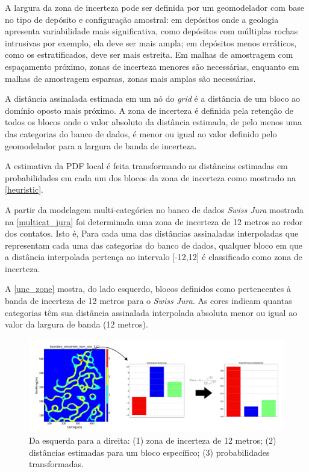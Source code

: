 A largura da zona de incerteza pode ser definida por um geomodelador com base no tipo de depósito e configuração amostral: em depósitos onde a geologia apresenta variabilidade mais significativa, como depósitos com múltiplas rochas intrusivas por exemplo, ela deve ser mais ampla; em depósitos menos erráticos, como os estratificados, deve ser mais estreita. Em malhas de amostragem com espaçamento próximo, zonas de incerteza menores são necessárias, enquanto em malhas de amostragem esparsas, zonas mais amplas são necessárias.

A distância assinalada estimada em um nó do \textit{grid} é a distância de um bloco ao domínio oposto mais próximo. A zona de incerteza é definida pela retenção de todos os blocos onde o valor absoluto da distância estimada, de pelo menos uma das categorias do banco de dados, é menor ou igual ao valor definido pelo geomodelador para a largura de banda de incerteza.

A estimativa da PDF local é feita transformando as distâncias estimadas em probabilidades em cada um dos blocos da zona de incerteza como mostrado na \autoref{heuristic}.

A partir da modelagem multi-categórica no banco de dados \textit{Swiss Jura} mostrada na \autoref{multicat_jura} foi determinada uma zona de incerteza de 12 metros ao redor dos contatos. Isto é, Para cada uma das distâncias assinaladas interpoladas que representam cada uma das categorias do banco de dados, qualquer bloco em que a distância interpolada pertença ao intervalo [-12,12] é classificado como zona de incerteza.

A \autoref{unc_zone} mostra, do lado esquerdo, blocos definidos como pertencentes à banda de incerteza de 12 metros para o \textit{Swiss Jura}. As cores indicam quantas categorias têm sua distância assinalada interpolada absoluta menor ou igual ao valor da largura de banda (12 metros).

\begin{figure}[H]
	\caption{\label{unc_zone} Da esquerda para a direita: (1) zona de incerteza de 12 metros; (2) distâncias estimadas para um bloco específico; (3) probabilidades transformadas.}
	\centering
		\includegraphics[width=\textwidth]{capitulo_3/imagens/trans_dist_prob.png}
\end{figure}

